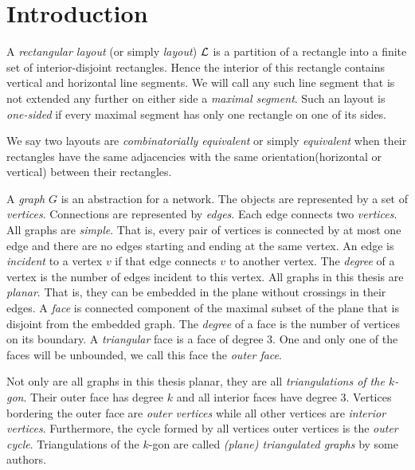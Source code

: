 

\section{Introduction}

  A  \emph{rectangular layout} (or simply \emph{layout}) $\mathcal{L}$ is a partition of a rectangle into a finite set of interior-disjoint rectangles. Hence the interior of this rectangle contains vertical and horizontal line segments. We will call any such line segment that is not extended any further on either side a \emph{maximal segment}. Such an layout is \emph{one-sided} if every maximal segment has only one rectangle on one of its sides.

  We say two layouts are  \emph{combinatorially equivalent} or simply \emph{equivalent} when their rectangles have the same adjacencies with the same orientation(horizontal or vertical) between their rectangles.

  A \emph{graph} $G$ is an abstraction for a network. The objects are represented by a set of \emph{vertices}. Connections are represented by \emph{edges}. Each edge connects two \emph{vertices}. All graphs are \emph{simple}. That is, every pair of vertices is connected by at most one edge and there are no edges starting and ending at the same vertex. An edge is \emph{incident} to a vertex $v$ if that edge connects $v$ to another vertex. The \emph{degree} of a vertex is the number of edges incident to this vertex.
  All graphs in this thesis are \emph{planar}. That is, they can be embedded in the plane without crossings in their edges. A \emph{face} is connected component of the maximal subset of the plane that is disjoint from the embedded graph. The \emph{degree} of a face is the number of vertices on its boundary. A \emph{triangular} face is a face of degree $3$. One and only one of the faces will be unbounded, we call this face the \emph{outer face}.

  Not only are all graphs in this thesis planar, they are all \emph{triangulations of the $k$-gon}. Their outer face has degree $k$ and all interior faces have degree $3$.
  Vertices bordering the outer face are \emph{outer vertices} while all other vertices are \emph{interior vertices}. Furthermore, the cycle formed by all vertices outer vertices is the \emph{outer cycle}.
  Triangulations of the $k$-gon are called \emph{(plane) triangulated graphs} by some authors.

